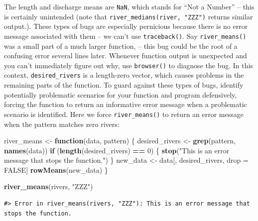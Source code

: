 \documentclass[
]{book}
\newenvironment{Shaded}{\begin{snugshade}}{\end{snugshade}}
\newcommand{\ControlFlowTok}[1]{\textcolor[rgb]{0.13,0.29,0.53}{\textbf{#1}}}
\newcommand{\DecValTok}[1]{\textcolor[rgb]{0.00,0.00,0.81}{#1}}
\newcommand{\KeywordTok}[1]{\textcolor[rgb]{0.13,0.29,0.53}{\textbf{#1}}}
\newcommand{\NormalTok}[1]{#1}
\newcommand{\OperatorTok}[1]{\textcolor[rgb]{0.81,0.36,0.00}{\textbf{#1}}}
\newcommand{\OtherTok}[1]{\textcolor[rgb]{0.56,0.35,0.01}{#1}}
\newcommand{\StringTok}[1]{\textcolor[rgb]{0.31,0.60,0.02}{#1}}
\begin{document}
The length and discharge means are \texttt{NaN}, which stands for ``Not a Number'' -- this is certainly unintended (note that \texttt{river\_medians(river,\ "ZZZ")} returns similar output.). These types of bugs are especially pernicious because there is no error message associated with them -- we can't use \texttt{traceback()}. Say \texttt{river\_means()} was a small part of a much larger function, -- this bug could be the root of a confusing error several lines later. Whenever function output is unexpected and you can't immediately figure out why, use \texttt{browser()} to diagnose the bug. In this context, \texttt{desired\_rivers} is a length-zero vector, which causes problems in the remaining parts of the function. To guard against these types of bugs, identify potentially problematic scenarios for your function and program defensively, forcing the function to return an informative error message when a problematic scenario is identified. Here we force \texttt{river\_means()} to return an error message when the pattern matches zero rivers:

\begin{Shaded}
\begin{Highlighting}[]
\NormalTok{river_means <-}\StringTok{ }\ControlFlowTok{function}\NormalTok{(data, pattern) \{}
\NormalTok{  desired_rivers <-}\StringTok{ }\KeywordTok{grep}\NormalTok{(pattern, }\KeywordTok{names}\NormalTok{(data))}
  \ControlFlowTok{if}\NormalTok{ (}\KeywordTok{length}\NormalTok{(desired_rivers) }\OperatorTok{==}\StringTok{ }\DecValTok{0}\NormalTok{) \{}
    \KeywordTok{stop}\NormalTok{(}\StringTok{"This is an error message that stops the function."}\NormalTok{)}
\NormalTok{  \}}
\NormalTok{  new_data <-}\StringTok{ }\NormalTok{data[, desired_rivers, drop =}\StringTok{ }\OtherTok{FALSE}\NormalTok{]}
  \KeywordTok{rowMeans}\NormalTok{(new_data)}
\NormalTok{\}}
\end{Highlighting}
\end{Shaded}

\begin{Shaded}
\begin{Highlighting}[]
\KeywordTok{river_means}\NormalTok{(rivers, }\StringTok{"ZZZ"}\NormalTok{)}
\end{Highlighting}
\end{Shaded}

\begin{verbatim}
#> Error in river_means(rivers, "ZZZ"): This is an error message that stops the function.
\end{verbatim}
\end{document}
